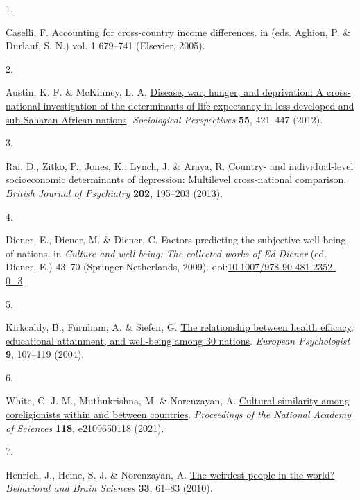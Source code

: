 \documentclass[
  man,floatsintext]{apa6}
\newlength{\cslhangindent}
\newlength{\csllabelwidth}
\newlength{\cslentryspacingunit} %
\newenvironment{CSLReferences}[2] %
 {%
  \setlength{\parindent}{0pt}
  \ifodd #1
  \let\oldpar\par
  \def\par{\hangindent=\cslhangindent\oldpar}
  \fi
  \setlength{\parskip}{#2\cslentryspacingunit}
 }%
 {}
\newcommand{\CSLLeftMargin}[1]{\parbox[t]{\csllabelwidth}{#1}}
\newcommand{\CSLRightInline}[1]{\parbox[t]{\linewidth - \csllabelwidth}{#1}\break}
\begin{document}
\hypertarget{refs}{}
\begin{CSLReferences}{0}{0}
\leavevmode{}%
\CSLLeftMargin{1. }%
\CSLRightInline{Caselli, F. \href{https://doi.org/10.1016/S1574-0684(05)01009-9}{Accounting for cross-country income differences}. in (eds. Aghion, P. \& Durlauf, S. N.) vol. 1 679--741 (Elsevier, 2005).}

\leavevmode{}%
\CSLLeftMargin{2. }%
\CSLRightInline{Austin, K. F. \& McKinney, L. A. \href{https://doi.org/10.1525/sop.2012.55.3.421}{Disease, war, hunger, and deprivation: A cross-national investigation of the determinants of life expectancy in less-developed and sub-{S}aharan {A}frican nations}. \emph{Sociological Perspectives} \textbf{55}, 421--447 (2012).}

\leavevmode{}%
\CSLLeftMargin{3. }%
\CSLRightInline{Rai, D., Zitko, P., Jones, K., Lynch, J. \& Araya, R. \href{https://doi.org/10.1192/bjp.bp.112.112482}{Country- and individual-level socioeconomic determinants of depression: Multilevel cross-national comparison}. \emph{British Journal of Psychiatry} \textbf{202}, 195--203 (2013).}

\leavevmode{}%
\CSLLeftMargin{4. }%
\CSLRightInline{Diener, E., Diener, M. \& Diener, C. Factors predicting the subjective well-being of nations. in \emph{Culture and well-being: The collected works of {E}d {D}iener} (ed. Diener, E.) 43--70 (Springer Netherlands, 2009). doi:\href{https://doi.org/10.1007/978-90-481-2352-0_3}{10.1007/978-90-481-2352-0\_3}.}

\leavevmode{}%
\CSLLeftMargin{5. }%
\CSLRightInline{Kirkcaldy, B., Furnham, A. \& Siefen, G. \href{https://doi.org/10.1027/1016-9040.9.2.107}{The relationship between health efficacy, educational attainment, and well-being among 30 nations}. \emph{European Psychologist} \textbf{9}, 107--119 (2004).}

\leavevmode{}%
\CSLLeftMargin{6. }%
\CSLRightInline{White, C. J. M., Muthukrishna, M. \& Norenzayan, A. \href{https://doi.org/10.1073/pnas.2109650118}{Cultural similarity among coreligionists within and between countries}. \emph{Proceedings of the National Academy of Sciences} \textbf{118}, e2109650118 (2021).}

\leavevmode{}%
\CSLLeftMargin{7. }%
\CSLRightInline{Henrich, J., Heine, S. J. \& Norenzayan, A. \href{https://doi.org/10.1017/S0140525X0999152X}{The weirdest people in the world?} \emph{Behavioral and Brain Sciences} \textbf{33}, 61--83 (2010).}


\end{CSLReferences}
\end{document}
